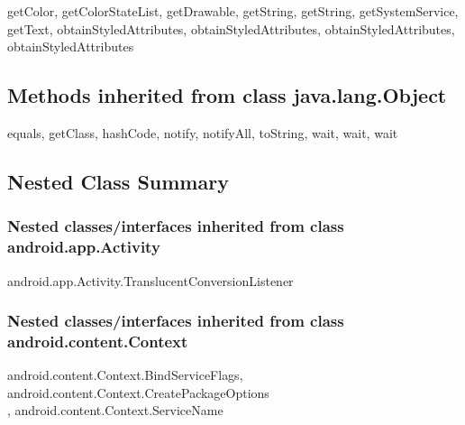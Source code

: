 getColor, getColorStateList, getDrawable, getString, getString, getSystemService, getText, obtainStyledAttributes, obtainStyledAttributes, obtainStyledAttributes, obtainStyledAttributes\\

\subsection{Methods inherited from class java.lang.Object}

equals, getClass, hashCode, notify, notifyAll, toString, wait, wait, wait\\


\subsection{Nested Class Summary}
\subsubsection{Nested classes/interfaces inherited from class android.app.Activity}

android.app.Activity.TranslucentConversionListener\\

\subsubsection{Nested classes/interfaces inherited from class android.content.Context}

android.content.Context.BindServiceFlags, android.content.Context.CreatePackageOptions\\, android.content.Context.ServiceName\\



